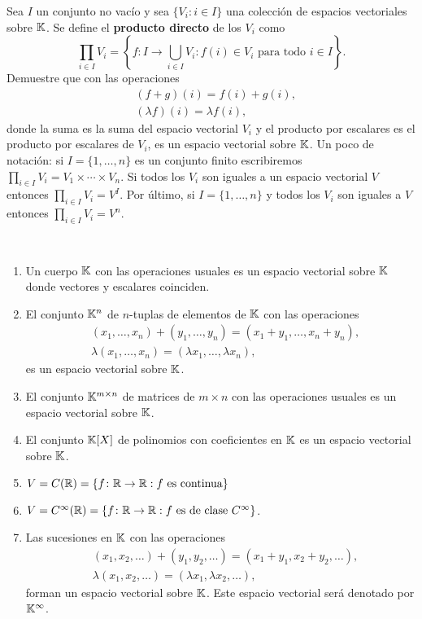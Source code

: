\begin{xca}
    Sea $I$ un conjunto no vacío y sea $\{V_i:i\in I\}$ una colección de
    espacios vectoriales sobre $\mathbb{K}$. Se define el \textbf{producto directo} de
    los $V_i$ como
    \[
        \prod_{i\in I}V_i=\left\{f\colon I\to\bigcup_{i\in I}V_i:f(i)\in V_i\text{ para todo $i\in I$}\right\}.
    \]
    Demuestre que con las operaciones 
    \begin{align*}
    &(f+g)(i)=f(i)+g(i),\\
    &(\lambda f)(i)=\lambda f(i),
    \end{align*}
    donde la suma es la suma del espacio vectorial $V_i$ y
    el producto por escalares es el producto por escalares de $V_i$, es un
    espacio vectorial sobre $\mathbb{K}$.  Un poco de notación: si $I=\{1,\dots,n\}$ es un
    conjunto finito escribiremos 
    $\prod_{i\in I}V_i=V_1\times\cdots\times V_n$. 
    Si todos los $V_i$ son iguales a un espacio vectorial $V$ entonces
    $\prod_{i\in I}V_i=V^{I}$. 
    Por último, si $I=\{1,\dots,n\}$ y todos los
    $V_i$ son iguales a $V$ entonces $\prod_{i\in I}V_i=V^n$. 
\end{xca}


\begin{examples}\
	\begin{enumerate}
        \item Un cuerpo $\mathbb{K}$ con las operaciones usuales es un espacio
            vectorial sobre $\mathbb{K}$ donde vectores y escalares coinciden.
        \item El conjunto $\mathbb{K}^n$ de $n$-tuplas de elementos de $\mathbb{K}$ con las
            operaciones
            \begin{align*}
                &(x_1,\dots,x_n)+(y_1,\dots,y_n)=(x_1+y_1,\dots,x_n+y_n),\\
                &\lambda(x_1,\dots,x_n)=(\lambda x_1,\dots,\lambda x_n),
            \end{align*}
            es un espacio vectorial sobre $\mathbb{K}$.
        \item El conjunto $\mathbb{K}^{m\times n}$ de matrices de $m\times n$ con las operaciones usuales
            es un espacio vectorial sobre $\mathbb{K}$.
        \item El conjunto $\mathbb{K}[X]$ de polinomios con coeficientes en $\mathbb{K}$ es un
            espacio vectorial sobre $\mathbb{K}$.
		\item $V=C(\mathbb{R})=\{f\colon\mathbb{R}\to\mathbb{R}:f\text{ es continua}\}$
        \item $V=C^\infty(\mathbb{R})=\{f\colon\mathbb{R}\to\mathbb{R}:f\text{ es de clase $C^\infty$}\}$.
        \item Las sucesiones en $\mathbb{K}$ con las operaciones
            \begin{align*}
                &(x_1,x_2,\dots)+(y_1,y_2,\dots)=(x_1+y_1,x_2+y_2,\dots),\\
                &\lambda (x_1,x_2,\dots)=(\lambda x_1,\lambda x_2,\dots),
            \end{align*}
            forman un espacio vectorial sobre $\mathbb{K}$. Este espacio vectorial será
            denotado por $\mathbb{K}^{\infty}$.
	\end{enumerate}
\end{examples}

